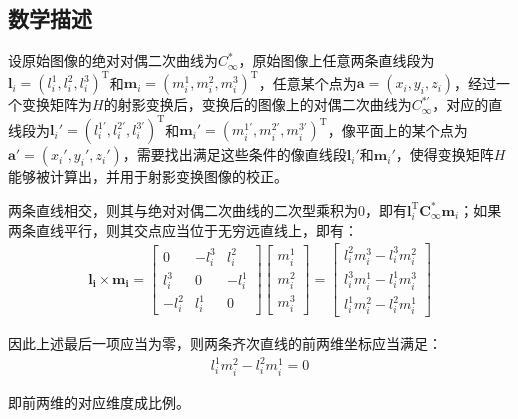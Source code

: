 \documentclass[11pt]{article}
\begin{document}
\subsection{数学描述}
设原始图像的绝对对偶二次曲线为$C_\infty^*$，原始图像上任意两条直线段为$\mathbf{l}_i=(l_i^1,l_i^2,l_i^3)^\textrm{T}$和$\mathbf{m}_i=(m_i^1,m_i^2,m_i^3)^\textrm{T}$，任意某个点为$\mathbf{a}=(x_i,y_i,z_i)$，经过一个变换矩阵为$H$的射影变换后，变换后的图像上的对偶二次曲线为$C_\infty^{*'}$，对应的直线段为$\mathbf{l}_i'=(l_i^{1'},l_i^{2'},l_i^{3'})^\textrm{T}$和$\mathbf{m}_i'=(m_i^{1'},m_i^{2'},m_i^{3'})^\textrm{T}$，像平面上的某个点为$\mathbf{a}'=(x_i',y_i',z_i')$，需要找出满足这些条件的像直线段$\mathbf{l}_i'$和$\mathbf{m}_i'$，使得变换矩阵$H$能够被计算出，并用于射影变换图像的校正。\par
两条直线相交，则其与绝对对偶二次曲线的二次型乘积为0，即有$\mathbf{l}_i^\mathrm{T}\mathbf{C_\infty^*}\mathbf{m}_i$；如果两条直线平行，则其交点应当位于无穷远直线上，即有：
\begin{align*}
  \mathbf{l_i\times m_i}=\begin{bmatrix}
                           0      & -l_i^3 & l_i^2  \\
                           l_i^3  & 0      & -l_i^1 \\
                           -l_i^2 & l_i^1  & 0
                         \end{bmatrix}\begin{bmatrix}
                                        m_i^1 \\m_i^2\\m_i^3
                                      \end{bmatrix}
  =\begin{bmatrix}
     l_i^2m_i^3-l_i^3m_i^2 \\
     l_i^3m_i^1-l_i^1m_i^3 \\
     l_i^1m_i^2-l_i^2m_i^1
   \end{bmatrix}
\end{align*}\par
因此上述最后一项应当为零，则两条齐次直线的前两维坐标应当满足：
\begin{align}
  l_i^1m_i^2-l_i^2m_i^1=0
  \label{eq:parallel}
\end{align}\par
即前两维的对应维度成比例。
\end{document}
